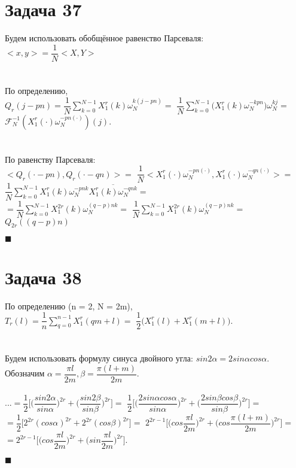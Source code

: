 \documentclass{article}
\title{}
\author{
	Дерюгин Денис, студент 561-й учебной группы
}
\date{\today}
\newcommand\proofend{\begin{flushright}$\blacksquare$\end{flushright}}
\begin{document}
\maketitle
\setcounter{MaxMatrixCols}{20}

\large {
\section*{Задача 37}

Будем использовать обобщённое равенство Парсеваля:\\
$ <x, y> = \dfrac{1}{N}<X, Y>$\\ \\ \\
По определению, \\
$Q_r(j - pn) = \dfrac{1}{N}\sum\limits_{k = 0}^{N-1}X_1^r(k)\omega_N^{k(j-pn)} =$
$\dfrac{1}{N}\sum\limits_{k = 0}^{N-1}\big (X_1^r(k)\omega_N^{-kpn}\big) \omega_N^{kj} =$
$\mathcal{F}^{-1}_N(X_1^r(\cdot) \omega_N^{-pn(\cdot)})(j)$. \\ \\ \\
По равенству Парсеваля:\\
$<Q_r(\cdot - pn), Q_r(\cdot - qn)> = $
$\dfrac{1}{N} <X_1^r(\cdot) \omega_N^{-pn(\cdot)}, X_1^r(\cdot) \omega_N^{-qn(\cdot)}>= $
$\dfrac{1}{N} \sum\limits_{k=0}^{N-1}X_1^r(k) \omega_N^{-pnk} \overline{X_1^r(k) \omega_N^{-qnk}}= $\\
$= \dfrac{1}{N} \sum\limits_{k=0}^{N-1}X_1^{2r}(k) \omega_N^{(q -p)nk}= $
$\dfrac{1}{N} \sum\limits_{k=0}^{N-1}X_1^{2r}(k) \omega_N^{(q - p)nk}= $
$Q_{2r}((q-p)n)$

\proofend

\section*{Задача 38}
По определению (n = 2, N = 2m),\\
$T_r(l) = \dfrac{1}{n}\sum\limits_{q=0}^{n-1} X_1^r(qm + l) = $
$\dfrac{1}{2}\big (X_1^r(l) + X_1^r(m + l) \big ).$\\ \\ \\
Будем использовать формулу синуса двойного угла: $sin 2\alpha = 2 sin\alpha cos \alpha$.\\
Обозначим $\alpha = \dfrac{\pi l}{2m}, \beta = \dfrac{\pi (l + m)}{2m}$. \\ \\
$... = \dfrac{1}{2}\Bigg [ \Bigg (\dfrac{sin 2\alpha}{sin \alpha} \Bigg )^{2r} + \Bigg (\dfrac{sin 2\beta}{sin \beta} \Bigg )^{2r}\Bigg ] = $
$\dfrac{1}{2}\Bigg [ \Bigg (\dfrac{2sin \alpha cos\alpha}{sin \alpha} \Bigg )^{2r} + \Bigg (\dfrac{2 sin \beta cos\beta}{sin \beta} \Bigg )^{2r}\Bigg ] = $\\
$= \dfrac{1}{2}\Bigg [ 2^{2r} (cos\alpha )^{2r} + 2^{2r} (cos\beta)^{2r}\Bigg ] = $
$2^{2r-1}\Bigg [ \Big (cos\dfrac{\pi l}{2m} \Big)^{2r} + \Big (cos\dfrac{\pi(l + m)}{2m} \Big )^{2r}\Bigg ] = $ \\
$ = 2^{2r-1}\Bigg [ \Big (cos\dfrac{\pi l}{2m} \Big)^{2r} + \Big (sin\dfrac{\pi l}{2m} \Big )^{2r}\Bigg ].$
\proofend

}
\end{document}
